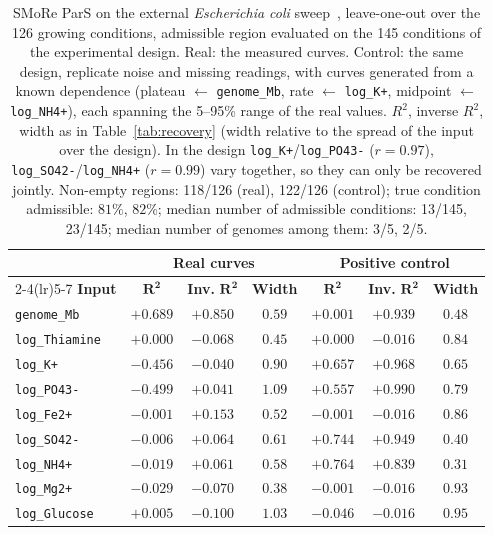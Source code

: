 \begin{table}[!htbp]
\caption{SMoRe ParS on the external \textit{Escherichia coli} sweep~\cite{gongying2025}, leave-one-out over the 126 growing conditions, admissible region evaluated on the 145 conditions of the experimental design. Real: the measured curves. Control: the same design, replicate noise and missing readings, with curves generated from a known dependence (plateau $\leftarrow$ \texttt{genome\_Mb}, rate $\leftarrow$ \texttt{log\_K+}, midpoint $\leftarrow$ \texttt{log\_NH4+}), each spanning the 5--95\% range of the real values. $R^2$, inverse $R^2$, width as in Table~\ref{tab:recovery} (width relative to the spread of the input over the design). In the design \texttt{log\_K+}/\texttt{log\_PO43-} ($r=0.97$), \texttt{log\_SO42-}/\texttt{log\_NH4+} ($r=0.99$) vary together, so they can only be recovered jointly. Non-empty regions: 118/126 (real), 122/126 (control); true condition admissible: $81\%$, $82\%$; median number of admissible conditions: 13/145, 23/145; median number of genomes among them: 3/5, 2/5.}
\label{tab:external}
\centering\footnotesize
\setlength{\tabcolsep}{4pt}
\begin{tabular}{lcccccc}
\toprule
 & \multicolumn{3}{c}{\textbf{Real curves}} & \multicolumn{3}{c}{\textbf{Positive control}} \\
\cmidrule(lr){2-4}\cmidrule(lr){5-7}
\textbf{Input} & $\mathbf{R^2}$ & \textbf{Inv. }$\mathbf{R^2}$ & \textbf{Width} & $\mathbf{R^2}$ & \textbf{Inv. }$\mathbf{R^2}$ & \textbf{Width} \\
\midrule
\texttt{genome\_Mb} & $+0.689$ & $+0.850$ & $0.59$ & $+0.001$ & $+0.939$ & $0.48$ \\
\texttt{log\_Thiamine} & $+0.000$ & $-0.068$ & $0.45$ & $+0.000$ & $-0.016$ & $0.84$ \\
\texttt{log\_K+} & $-0.456$ & $-0.040$ & $0.90$ & $+0.657$ & $+0.968$ & $0.65$ \\
\texttt{log\_PO43-} & $-0.499$ & $+0.041$ & $1.09$ & $+0.557$ & $+0.990$ & $0.79$ \\
\texttt{log\_Fe2+} & $-0.001$ & $+0.153$ & $0.52$ & $-0.001$ & $-0.016$ & $0.86$ \\
\texttt{log\_SO42-} & $-0.006$ & $+0.064$ & $0.61$ & $+0.744$ & $+0.949$ & $0.40$ \\
\texttt{log\_NH4+} & $-0.019$ & $+0.061$ & $0.58$ & $+0.764$ & $+0.839$ & $0.31$ \\
\texttt{log\_Mg2+} & $-0.029$ & $-0.070$ & $0.38$ & $-0.001$ & $-0.016$ & $0.93$ \\
\texttt{log\_Glucose} & $+0.005$ & $-0.100$ & $1.03$ & $-0.046$ & $-0.016$ & $0.95$ \\
\bottomrule
\end{tabular}
\end{table}
